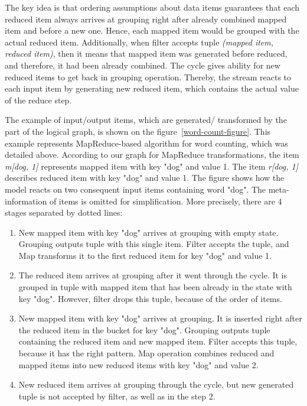 The key idea is that ordering assumptions about data items guarantees that each reduced item always arrives at grouping right after already combined mapped item and before a new one. Hence, each mapped item would be grouped with the actual reduced item. Additionally, when filter accepts tuple {\it (mapped item, reduced item)}, then it means that mapped item was generated before reduced, and therefore, it had been already combined. The cycle gives ability for new reduced items to get back in grouping operation. Thereby, the stream reacts to each input item by generating new reduced item, which contains the actual value of the reduce step.

The example of input/output items, which are generated/ transformed by the part of the logical graph, is shown on the figure~\ref {word-count-figure}. This example represents MapReduce-based algorithm for word counting, which was detailed above. According to our graph for MapReduce transformations, the item {\it m[dog, 1]} represents mapped item with key "dog" and value 1. The item {\it r[dog, 1]} describes reduced item with key "dog" and value 1. The figure shows how the model reacts on two consequent input items containing word "dog". The meta-information of items is omitted for simplification. More precisely, there are 4 stages separated by dotted lines:

\begin{enumerate}
    \item New mapped item with key "dog" arrives at grouping with empty state. Grouping outputs tuple with this single item. Filter accepts the tuple, and Map transforms it to the first reduced item for key "dog" and value 1.
    \item The reduced item arrives at grouping after it went through the cycle. It is grouped in tuple with mapped item that has been already in the state with key "dog". However, filter drops this tuple, because of the order of items.
    \item New mapped item with key "dog" arrives at grouping. It is inserted right after the reduced item in the bucket for key "dog". Grouping outputs tuple containing the reduced item and new mapped item. Filter accepts this tuple, because it has the right pattern. Map operation combines reduced and mapped items into new reduced items with key "dog" and value 2.
    \item New reduced item arrives at grouping through the cycle, but new generated tuple is not accepted by filter, as well as in the step 2.
\end{enumerate}

